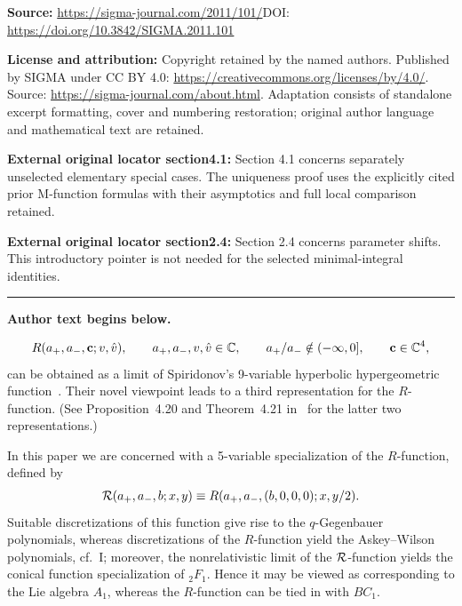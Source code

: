 \documentclass[11pt]{article}
\numberwithin{equation}{section}
\newcommand{\C}{{\mathbb C}}
\newcommand{\cR}{{\cal R}}
\begin{document}
\noindent\textbf{Source:} \url{https://sigma-journal.com/2011/101/}\quad DOI: \url{https://doi.org/10.3842/SIGMA.2011.101}\par
\noindent\textbf{License and attribution:} Copyright retained by the named authors. Published by SIGMA under CC BY 4.0: \url{https://creativecommons.org/licenses/by/4.0/}. Source: \url{https://sigma-journal.com/about.html}. Adaptation consists of standalone excerpt formatting, cover and numbering restoration; original author language and mathematical text are retained.\par
\noindent\textbf{External original locator section4.1:} Section 4.1 concerns separately unselected elementary special cases. The uniqueness proof uses the explicitly cited prior M-function formulas with their asymptotics and full local comparison retained.\par
\noindent\textbf{External original locator section2.4:} Section 2.4 concerns parameter shifts. This introductory pointer is not needed for the selected minimal-integral identities.\par
\medskip\hrule\medskip\noindent\textbf{Author text begins below.}\par
\setcounter{section}{1}
\setcounter{subsection}{0}
\setcounter{subsubsection}{0}
\setcounter{equation}{0}
\begin{gather}\label{Rdef}
R(a_{+},a_{-},{\bf c};v,\hat{v}),\qquad a_{+}, a_{-},v,\hat{v}\in\C,\qquad a_{+}/a_{-}\notin (-\infty,0],\qquad {\bf c}\in\C^4,
\end{gather}
can be obtained as a limit of Spiridonov's 9-variable hyperbolic hypergeometric function~\cite{spir}. Their novel viewpoint leads to a third representation for the $R$-function. (See Proposition~4.20 and Theorem~4.21 in~\cite{bust} for the latter two representations.)

In this paper we are concerned with a 5-variable specialization of the $R$-function, def\/ined by
\begin{gather}\label{cRdef}
\cR(a_{+},a_{-},b;x,y)\equiv R(a_{+},a_{-},(b,0,0,0);x,y/2).
\end{gather}
Suitable discretizations of this function give rise to the $q$-Gegenbauer polynomials, whereas discretizations of the $R$-function yield the Askey--Wilson polynomials, cf.~I; moreover, the nonrelativistic limit of the $\cR$-function yields the conical function specialization of $_2F_1$. Hence it may be viewed as corresponding to the Lie algebra $A_1$, whereas the $R$-function can be tied in with $BC_1$.
\end{document}
